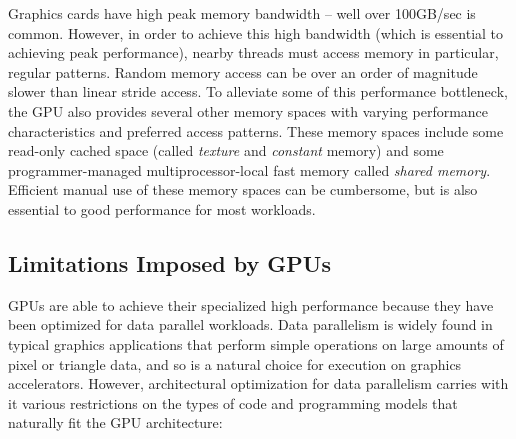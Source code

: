 \documentclass[preprint]{sigplanconf}
\begin{document}
Graphics cards have high peak memory bandwidth -- well over 100GB/sec is common.  However, in order to achieve this high bandwidth (which is essential to achieving peak performance), nearby threads must access memory in particular, regular patterns.  Random memory access can be over an order of magnitude slower than linear stride access.  To alleviate some of this performance bottleneck, the GPU also provides several other memory spaces with varying performance characteristics and preferred access patterns.  These memory spaces include some read-only cached space (called \emph{texture} and \emph{constant} memory) and some programmer-managed multiprocessor-local fast memory called \emph{shared memory}.  Efficient manual use of these memory spaces can be cumbersome, but is also essential to good performance for most workloads.

\subsection{Limitations Imposed by GPUs}
\label{GPULimitations}
GPUs are able to achieve their specialized high performance because they have been optimized for data parallel workloads. Data parallelism is widely found in typical graphics applications that perform simple operations on large amounts of pixel or triangle data, and so is a natural choice for execution on graphics accelerators.  However, architectural optimization for data parallelism carries with it various restrictions on the types of code and programming models that naturally fit the GPU architecture:
\end{document}
